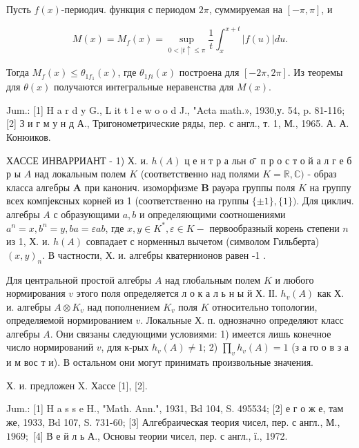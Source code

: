 \documentclass[10pt]{article}
\begin{document}
Пусть $f(x)$-периодич. функция с периодом $2 \pi$, суммируемая на $[-\pi, \pi]$, и



\[

M(x)=M_{f}(x)=\sup _{0<\mid t \uparrow \leqslant \pi} \frac{1}{t} \int_{x}^{x+t}|f(u)| d u .

\]



Тогда $M_{f}(x) \leqslant \theta_{1 f_{1}}(x)$, где $\theta_{1 f i}(x)$ построена для $[-2 \pi, 2 \pi]$. Из теоремы для $\theta(x)$ получаются интегральные неравенства для $M(x)$.



Jum.: [1] H a r d y G., L it t l e w o o d J., "Acta math.», 1930,у. 54, p. 81-116; [2] З и г м у н д А., Тригонометрические ряды, пер. с англ., т. 1, М., 1965. А. А. Конюиков.



ХАССЕ ИНВАРРИАНТ - 1) Х. и. $h(A)$ ц е н т р а льн о ̈̈ п р о с т о й а л г е б р ы $A$ над локальным полем $K$ (соответственно над полями $K=\mathbb{R}, \mathbb{C})$ - образ класса алгебры $\boldsymbol{A}$ при канонич. изоморфизме $\boldsymbol{B}$ рауәра группы поля $K$ на группу всех компјексных корней из 1 (соответственно на группы $\{ \pm 1\},\{1\})$. Для циклич. алгебры $A$ с образующими $a, b$ и определяющими соотношениями $a^{n}=x, b^{n}=y, b a=\varepsilon a b$, где $x, y \in K^{*}, \varepsilon \in K-$ первообразный корень степени $n$ из 1, Х. и. $h(A)$ совпадает с норменныл вычетом (символом Гильберта) $(x, y)_{n}$. В частности, Х. и. алгебры кватернионов равен -1 .



Для центральной простой алгебры $A$ над глобальным полем $K$ и любого нормирования $v$ этого поля определяется л о к а л ь н ы й Х. ІІ. $h_{v}(A)$ как Х. и. алгебры $A \otimes K_{v}$ над пополнением $K_{v}$ поля $K$ относительно топологии, определяемой нормированием $v$. Локальные Х. п. однозначно определяют класс алгебры $A$. Они связаны следующими условиями: 1) имеется лишь конечное число нормирований $v$, для к-рых $h_{v}(A) \neq 1$; 2) $\prod_{v} h_{v}(A)=1$ (з а го о в з а и м вос т и). В остальном они могут принимать произвольные значения.



Х. и. предложен X. Хассе [1], [2].



Jum.: [1] H a s s e H., "Math. Ann.", 1931, Bd 104, S. 495534; [2] е г о ж е, там же, 1933, Bd 107, S. 731-60; [3] Алгебраическая теория чисел, пер. с англ., М., $1969 ;$ [4] В е й л ь А., Основы теории чисел, пер. с англ., ї., 1972.
\end{document}
